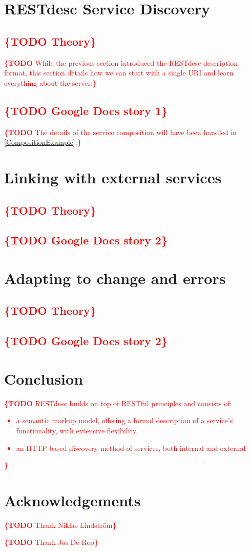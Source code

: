 \documentclass[runningheads,a4paper, twocolumn]{llncs}
\newcommand{\todo}[1]{\noindent\textcolor{red}{{\bf \{TODO} #1{\bf \}}}}
\begin{document}
\clearpage


\section{RESTdesc Service Discovery}
\subsection{\todo{Theory}}
\todo{While the previous section introduced the RESTdesc description format, this section details how we can start with a single URI and learn everything about the server.}

\subsection{\todo{Google Docs story 1}}
\todo{The details of the service composition will have been handled in \ref{CompositionExample}.}


\section{Linking with external services}
\subsection{\todo{Theory}}
\subsection{\todo{Google Docs story 2}}


\section{Adapting to change and errors}
\subsection{\todo{Theory}}
\subsection{\todo{Google Docs story 2}}


\section{Conclusion}

\todo{RESTdesc builds on top of RESTful principles and consists of:
\begin{itemize}
\item a semantic markup model, offering a formal description of a service's functionality, with extensive flexibility
\item an HTTP-based discovery method of services, both internal and external
\end{itemize}
}


\section*{Acknowledgements}
\todo{Thank Niklas Lindstr\"om}

\todo{Thank Jos De Roo}

\renewcommand{\ttdefault}{cmvtt}



\end{document}
